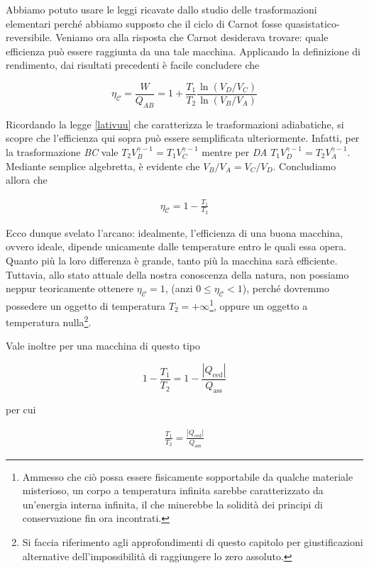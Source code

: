 \noindent Abbiamo potuto usare le leggi ricavate dallo studio delle
trasformazioni elementari perché abbiamo supposto che il ciclo di
Carnot fosse quasistatico-reversibile. Veniamo ora alla risposta che
Carnot desiderava trovare: quale efficienza può essere raggiunta da
una tale macchina. Applicando la definizione di rendimento, dai
risultati precedenti è facile concludere che

\[ \eta_\mathcal{C} = \frac{W}{Q_{AB}} = 1 + \frac{T_1}{T_2}\frac{\ln(V_D/V_C)}{\ln(V_B/V_A)} \]

\noindent Ricordando la legge \ref{lativuu} che caratterizza le
trasformazioni adiabatiche, si scopre che l'efficienza qui sopra può
essere semplificata ulteriormente. Infatti, per la trasformazione
\textit{BC} vale $T_2V_B^{\gamma - 1} = T_1V_C^{\gamma - 1}$ mentre
per \textit{DA} $T_1V_D^{\gamma - 1} = T_2V_A^{\gamma - 1}$. Mediante
semplice algebretta, è evidente che $V_B/V_A = V_C/V_D$. Concludiamo
allora che

\begin{align}
    \eta_\mathcal{C} = 1 - \frac{T_1}{T_2}
\end{align}

Ecco dunque svelato l'arcano: idealmente, l'efficienza di una buona
macchina, ovvero ideale, dipende unicamente dalle temperature entro
le quali essa opera. Quanto più la loro differenza è grande, tanto
più la macchina sarà efficiente. Tuttavia, allo stato attuale della
nostra conoscenza della natura, non possiamo neppur teoricamente
ottenere $\eta_\mathcal{C} = 1$, (anzi $0 \leq \eta_\mathcal{C} < 1$),
perché dovremmo possedere un oggetto di temperatura $T_2 = +\infty$\footnote{Ammesso che ciò possa essere fisicamente sopportabile da qualche materiale misterioso, un corpo a temperatura infinita sarebbe
caratterizzato da un'energia interna infinita, il che minerebbe la
solidità dei principi di conservazione fin ora incontrati.},
oppure un oggetto a temperatura nulla\footnote{Si faccia
riferimento agli approfondimenti di questo capitolo per giustificazioni
alternative dell'impossibilità di raggiungere lo zero assoluto.}.

Vale inoltre per una macchina di questo tipo

\[ 1 - \frac{T_1}{T_2} = 1 - \frac{|Q_\text{ced}|}{Q_\text{ass}} \]

\noindent per cui

\begin{align}
    \frac{T_1}{T_2} = \frac{|Q_\text{ced}|}{Q_\text{ass}}\label{temp_heat_ratio}
\end{align}

